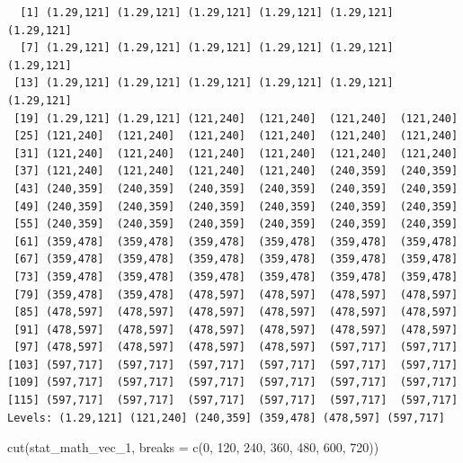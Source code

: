 \documentclass[
  letterpaper,
  DIV=11,
  numbers=noendperiod]{scrreprt}
\newenvironment{Shaded}{\begin{snugshade}}{\end{snugshade}}
\newcommand{\AttributeTok}[1]{\textcolor[rgb]{0.40,0.45,0.13}{#1}}
\newcommand{\DecValTok}[1]{\textcolor[rgb]{0.68,0.00,0.00}{#1}}
\newcommand{\FunctionTok}[1]{\textcolor[rgb]{0.28,0.35,0.67}{#1}}
\newcommand{\NormalTok}[1]{\textcolor[rgb]{0.00,0.23,0.31}{#1}}
\begin{document}
\begin{verbatim}
  [1] (1.29,121] (1.29,121] (1.29,121] (1.29,121] (1.29,121] (1.29,121]
  [7] (1.29,121] (1.29,121] (1.29,121] (1.29,121] (1.29,121] (1.29,121]
 [13] (1.29,121] (1.29,121] (1.29,121] (1.29,121] (1.29,121] (1.29,121]
 [19] (1.29,121] (1.29,121] (121,240]  (121,240]  (121,240]  (121,240] 
 [25] (121,240]  (121,240]  (121,240]  (121,240]  (121,240]  (121,240] 
 [31] (121,240]  (121,240]  (121,240]  (121,240]  (121,240]  (121,240] 
 [37] (121,240]  (121,240]  (121,240]  (121,240]  (240,359]  (240,359] 
 [43] (240,359]  (240,359]  (240,359]  (240,359]  (240,359]  (240,359] 
 [49] (240,359]  (240,359]  (240,359]  (240,359]  (240,359]  (240,359] 
 [55] (240,359]  (240,359]  (240,359]  (240,359]  (240,359]  (240,359] 
 [61] (359,478]  (359,478]  (359,478]  (359,478]  (359,478]  (359,478] 
 [67] (359,478]  (359,478]  (359,478]  (359,478]  (359,478]  (359,478] 
 [73] (359,478]  (359,478]  (359,478]  (359,478]  (359,478]  (359,478] 
 [79] (359,478]  (359,478]  (478,597]  (478,597]  (478,597]  (478,597] 
 [85] (478,597]  (478,597]  (478,597]  (478,597]  (478,597]  (478,597] 
 [91] (478,597]  (478,597]  (478,597]  (478,597]  (478,597]  (478,597] 
 [97] (478,597]  (478,597]  (478,597]  (478,597]  (597,717]  (597,717] 
[103] (597,717]  (597,717]  (597,717]  (597,717]  (597,717]  (597,717] 
[109] (597,717]  (597,717]  (597,717]  (597,717]  (597,717]  (597,717] 
[115] (597,717]  (597,717]  (597,717]  (597,717]  (597,717]  (597,717] 
Levels: (1.29,121] (121,240] (240,359] (359,478] (478,597] (597,717]
\end{verbatim}

\begin{Shaded}
\begin{Highlighting}[]
\FunctionTok{cut}\NormalTok{(stat\_math\_vec\_1, }\AttributeTok{breaks =} \FunctionTok{c}\NormalTok{(}\DecValTok{0}\NormalTok{, }\DecValTok{120}\NormalTok{, }\DecValTok{240}\NormalTok{, }\DecValTok{360}\NormalTok{, }\DecValTok{480}\NormalTok{, }\DecValTok{600}\NormalTok{, }\DecValTok{720}\NormalTok{))}
\end{Highlighting}
\end{Shaded}
\end{document}
